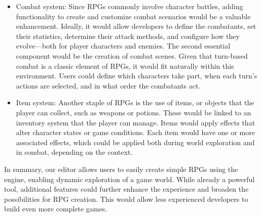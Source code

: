 \begin{itemize}
\item Combat system: Since RPGs commonly involve character battles, adding functionality to create and customize combat scenarios would be a valuable enhancement. Ideally, it would allow developers to define the combatants, set their statistics, determine their attack methods, and configure how they evolve—both for player characters and enemies. The second essential component would be the creation of combat scenes. Given that turn-based combat is a classic element of RPGs, it would fit naturally within this environment. Users could define which characters take part, when each turn’s actions are selected, and in what order the combatants act.

\item Item system: Another staple of RPGs is the use of items, or objects that the player can collect, such as weapons or potions. These would be linked to an inventory system that the player can manage. Items would apply effects that alter character states or game conditions. Each item would have one or more associated effects, which could be applied both during world exploration and in combat, depending on the context.
\end{itemize}

\medskip

In summary, our editor allows users to easily create simple RPGs using the engine, enabling dynamic exploration of a game world. While already a powerful tool, additional features could further enhance the experience and broaden the possibilities for RPG creation. This would allow less experienced developers to build even more complete games.